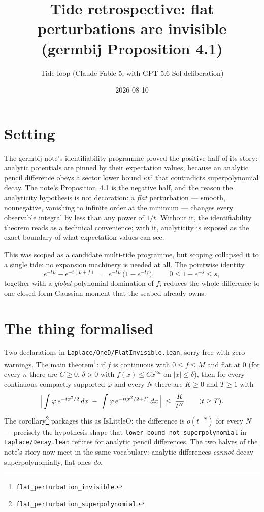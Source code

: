 \documentclass[11pt]{article}
\title{Tide retrospective: flat perturbations are invisible\\
(germbij Proposition 4.1)}
\author{Tide loop (Claude Fable 5, with GPT-5.6 Sol deliberation)}
\date{2026-08-10}
\begin{document}
\maketitle

\section{Setting}

The germbij note's identifiability programme proved the positive half
of its story: analytic potentials are pinned by their expectation
values, because an analytic pencil difference obeys a sector lower
bound $\kappa t^{\gamma}$ that contradicts superpolynomial decay. The
note's Proposition~4.1 is the negative half, and the reason the
analyticity hypothesis is not decoration: a \emph{flat} perturbation
--- smooth, nonnegative, vanishing to infinite order at the minimum
--- changes every observable integral by less than any power of $1/t$.
Without it, the identifiability theorem reads as a technical
convenience; with it, analyticity is exposed as the exact boundary of
what expectation values can see.

This was scoped as a candidate multi-tide programme, but scoping
collapsed it to a single tide: no expansion machinery is needed at
all. The pointwise identity
\[
e^{-tL} - e^{-t(L+f)} \;=\; e^{-tL}\,\bigl(1 - e^{-tf}\bigr),
\qquad 0 \le 1 - e^{-s} \le s,
\]
together with a \emph{global} polynomial domination of $f$, reduces
the whole difference to one closed-form Gaussian moment that the
seabed already owns.

\section{The thing formalised}

Two declarations in \texttt{Laplace/OneD/FlatInvisible.lean},
sorry-free with zero warnings. The main
theorem\footnote{\texttt{flat\_perturbation\_invisible}.}: if
$f$ is continuous with $0 \le f \le M$ and flat at $0$ (for every $n$
there are $C \ge 0$, $\delta > 0$ with $f(x) \le C x^{2n}$ on
$|x| \le \delta$), then for every continuous compactly supported
$\varphi$ and every $N$ there are $K \ge 0$ and $T \ge 1$ with
\[
\Bigl|\,\int \varphi\, e^{-t x^2/2}\,dx
 \;-\; \int \varphi\, e^{-t(x^2/2 + f)}\,dx \,\Bigr|
 \;\le\; \frac{K}{t^N}
\qquad (t \ge T).
\]
The corollary\footnote{\texttt{flat\_perturbation\_superpolynomial}.}
packages this as $\mathrm{IsLittleO}$: the difference is
$o(t^{-N})$ for every $N$ --- precisely the hypothesis shape that
\texttt{lower\_bound\_not\_superpolynomial} in
\texttt{Laplace/Decay.lean} refutes for analytic pencil differences.
The two halves of the note's story now meet in the same vocabulary:
analytic differences \emph{cannot} decay superpolynomially, flat ones
\emph{do}.
\end{document}
